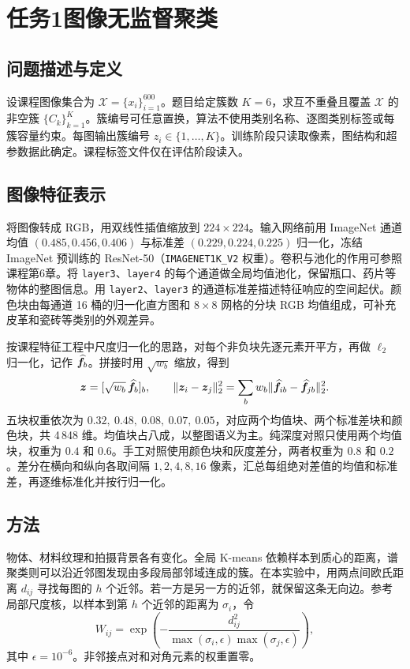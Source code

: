 \section{任务1\quad 图像无监督聚类}
\label{sec:task1}
\subsection{问题描述与定义}
设课程图像集合为 $\mathcal X=\{x_i\}_{i=1}^{600}$。题目给定簇数 $K=6$，求互不重叠且覆盖 $\mathcal X$ 的非空簇 $\{C_k\}_{k=1}^K$。簇编号可任意置换，算法不使用类别名称、逐图类别标签或每簇容量约束。每图输出簇编号 $z_i\in\{1,\ldots,K\}$。训练阶段只读取像素，图结构和超参数据此确定。课程标签文件仅在评估阶段读入。

\subsection{图像特征表示}
将图像转成 RGB，用双线性插值缩放到 $224\times224$。输入网络前用 ImageNet 通道均值 $(0.485,0.456,0.406)$ 与标准差 $(0.229,0.224,0.225)$ 归一化，冻结 ImageNet 预训练的 ResNet-50（\texttt{IMAGENET1K\_V2} 权重）\cite{he2016,torchvisionweights}。卷积与池化的作用可参照课程第6章\cite{coursedeep}。将 \texttt{layer3}、\texttt{layer4} 的每个通道做全局均值池化，保留瓶口、药片等物体的整图信息。用 \texttt{layer2}、\texttt{layer3} 的通道标准差描述特征响应的空间起伏。颜色块由每通道 16 桶的归一化直方图和 $8\times8$ 网格的分块 RGB 均值组成，可补充皮革和瓷砖等类别的外观差异。

按课程特征工程中尺度归一化的思路\cite{coursefeat}，对每个非负块先逐元素开平方，再做 $\ell_2$ 归一化，记作 $\widehat{\bm{f}}_b$。拼接时用 $\sqrt{w_b}$ 缩放，得到
\begin{equation}
 \bm{z}=[\sqrt{w_b}\,\widehat{\bm{f}}_b]_b,
 \qquad
 \|\bm{z}_i-\bm{z}_j\|_2^2
 =\sum_b w_b\|\widehat{\bm{f}}_{ib}-\widehat{\bm{f}}_{jb}\|_2^2 .
\end{equation}
五块权重依次为 $0.32,\ 0.48,\ 0.08,\ 0.07,\ 0.05$，对应两个均值块、两个标准差块和颜色块，共 4\,848 维。均值块占八成，以整图语义为主。纯深度对照只使用两个均值块，权重为 $0.4$ 和 $0.6$。手工对照使用颜色块和灰度差分，两者权重为 $0.8$ 和 $0.2$。差分在横向和纵向各取间隔 $1,2,4,8,16$ 像素，汇总每组绝对差值的均值和标准差，再逐维标准化并按行归一化。

\subsection{方法}
物体、材料纹理和拍摄背景各有变化。全局 K-means 依赖样本到质心的距离，谱聚类则可以沿近邻图发现由多段局部邻域连成的簇。在本实验中，用两点间欧氏距离 $d_{ij}$ 寻找每图的 $h$ 个近邻。若一方是另一方的近邻，就保留这条无向边。参考局部尺度核\cite{zelnik2004}，以样本到第 $h$ 个近邻的距离为 $\sigma_i$，令
\begin{equation}
 W_{ij}=\exp\!\left(
    -\frac{d_{ij}^2}{\max(\sigma_i,\epsilon)\max(\sigma_j,\epsilon)}
                         \right),
\end{equation}
其中 $\epsilon=10^{-6}$。非邻接点对和对角元素的权重置零。

